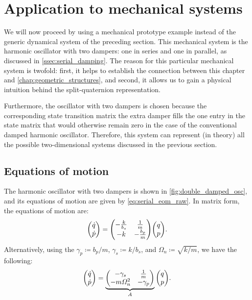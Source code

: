 \section{Application to mechanical systems}
\label{sec:mechanical}
We will now proceed by using a mechanical prototype example instead of the generic dynamical system of the preceding section. This mechanical system is the harmonic oscillator with two dampers: one in series and one in parallel, as discussed in \cref{ssec:serial_damping}. The reason for this particular mechanical system is twofold: first, it helps to establish the connection between this chapter and \cref{chap:geometric_structures}, and second, it allows us to gain a physical intuition behind the split-quaternion representation. 

Furthermore, the oscillator with two dampers is chosen because the corresponding state transition matrix the extra damper fills the one entry in the state matrix that would otherwise remain zero in the case of the conventional damped harmonic oscillator. Therefore, this system can represent (in theory) all the possible two-dimensional systems discussed in the previous section.

\subsection{Equations of motion}
The harmonic oscillator with two dampers is shown in \cref{fig:double_damped_osc}, and its equations of motion are given by \cref{eq:serial_eom_raw}. In matrix form, the equations of motion are:
\begin{equation*}
    \mqty(\dot{q}\\\dot{p}) = \mqty(-\tfrac{k}{b_s} & \tfrac{1}{m} \\ -k & - \tfrac{b_p}{m})\mqty(q \\ p).
\end{equation*}
Alternatively, using the \(\gamma_p \coloneq b_p/m\), \(\gamma_s \coloneq k/b_s\), and \(\Omega_n \coloneq \sqrt{k/m}\), we have the following:
\begin{equation}
    \mqty(\dot{q}\\\dot{p}) = \underbrace{\mqty(-\gamma_s & \frac{1}{m} \\ -m\Omega_n^2 & - \gamma_p)}_A \mqty(q \\ p).
    \label{eq:ddho_eom}
\end{equation}

